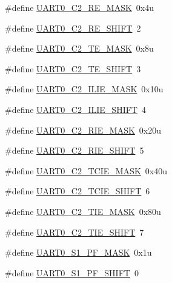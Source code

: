 \begin{DoxyCompactItemize}
\#define \hyperlink{group___u_a_r_t0___register___masks_gac49427a605bbd952edc2790821b19161}{U\+A\+R\+T0\+\_\+\+C2\+\_\+\+R\+E\+\_\+\+M\+A\+SK}~0x4u
\item 
\#define \hyperlink{group___u_a_r_t0___register___masks_ga9b0dc4fdd0de7040c2aa8746f9b0465e}{U\+A\+R\+T0\+\_\+\+C2\+\_\+\+R\+E\+\_\+\+S\+H\+I\+FT}~2
\item 
\#define \hyperlink{group___u_a_r_t0___register___masks_ga78c914234e9656aaa12582b408a31e64}{U\+A\+R\+T0\+\_\+\+C2\+\_\+\+T\+E\+\_\+\+M\+A\+SK}~0x8u
\item 
\#define \hyperlink{group___u_a_r_t0___register___masks_gadde2643c4aa03640ab1cf95ba8e07176}{U\+A\+R\+T0\+\_\+\+C2\+\_\+\+T\+E\+\_\+\+S\+H\+I\+FT}~3
\item 
\#define \hyperlink{group___u_a_r_t0___register___masks_ga10be4cac887b9aa3c11bbfef25808578}{U\+A\+R\+T0\+\_\+\+C2\+\_\+\+I\+L\+I\+E\+\_\+\+M\+A\+SK}~0x10u
\item 
\#define \hyperlink{group___u_a_r_t0___register___masks_ga4ab02fff3512ff6b92e5aecd62049c39}{U\+A\+R\+T0\+\_\+\+C2\+\_\+\+I\+L\+I\+E\+\_\+\+S\+H\+I\+FT}~4
\item 
\#define \hyperlink{group___u_a_r_t0___register___masks_ga9e2ddb43bcd4b9554e0c7a6fa0402efb}{U\+A\+R\+T0\+\_\+\+C2\+\_\+\+R\+I\+E\+\_\+\+M\+A\+SK}~0x20u
\item 
\#define \hyperlink{group___u_a_r_t0___register___masks_gac718305b3ddae3fe258e2735f8a074bf}{U\+A\+R\+T0\+\_\+\+C2\+\_\+\+R\+I\+E\+\_\+\+S\+H\+I\+FT}~5
\item 
\#define \hyperlink{group___u_a_r_t0___register___masks_ga8d9362d72300e5dcee78580a773b60c9}{U\+A\+R\+T0\+\_\+\+C2\+\_\+\+T\+C\+I\+E\+\_\+\+M\+A\+SK}~0x40u
\item 
\#define \hyperlink{group___u_a_r_t0___register___masks_ga019da6a7871d38f10460ea7ff32b54cc}{U\+A\+R\+T0\+\_\+\+C2\+\_\+\+T\+C\+I\+E\+\_\+\+S\+H\+I\+FT}~6
\item 
\#define \hyperlink{group___u_a_r_t0___register___masks_ga57c06364890b354bb04a5f968fc95c42}{U\+A\+R\+T0\+\_\+\+C2\+\_\+\+T\+I\+E\+\_\+\+M\+A\+SK}~0x80u
\item 
\#define \hyperlink{group___u_a_r_t0___register___masks_ga3d54c6b6f2942f117b23a3dd9b53ec2e}{U\+A\+R\+T0\+\_\+\+C2\+\_\+\+T\+I\+E\+\_\+\+S\+H\+I\+FT}~7
\item 
\#define \hyperlink{group___u_a_r_t0___register___masks_gaec8a65a2e60f3455e64b085accacb3ef}{U\+A\+R\+T0\+\_\+\+S1\+\_\+\+P\+F\+\_\+\+M\+A\+SK}~0x1u
\item 
\#define \hyperlink{group___u_a_r_t0___register___masks_ga28bf9a70a8a7b24b889512625d6df39d}{U\+A\+R\+T0\+\_\+\+S1\+\_\+\+P\+F\+\_\+\+S\+H\+I\+FT}~0

\end{DoxyCompactItemize}
